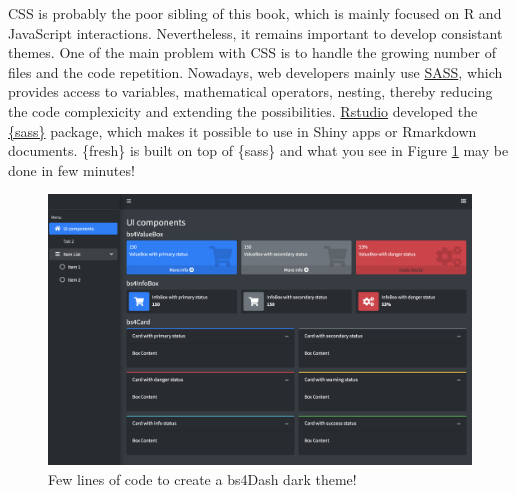 \documentclass[
]{book}
\begin{document}
CSS is probably the poor sibling of this book, which is mainly focused on R and JavaScript interactions. Nevertheless, it remains important to develop consistant themes. One of the main problem with CSS is to handle the growing number of files and the code repetition. Nowadays, web developers mainly use \href{https://sass-lang.com/guide}{SASS}, which provides access to variables, mathematical operators, nesting, thereby reducing the code complexicity and extending the possibilities. \href{https://rstudio.com}{Rstudio} developed the \href{https://rstudio.github.io/sass/articles/sass.html}{\{sass\}} package, which makes it possible to use in Shiny apps or Rmarkdown documents. \{fresh\} is built on top of \{sass\} and what you see in Figure \ref{fig:bs4Dash-fresh} may be done in few minutes!

\begin{figure}
\includegraphics[width=34.22in]{images/beautify/bs4Dash-fresh} \caption{Few lines of code to create a bs4Dash dark theme!}\label{fig:bs4Dash-fresh}
\end{figure}
\end{document}
